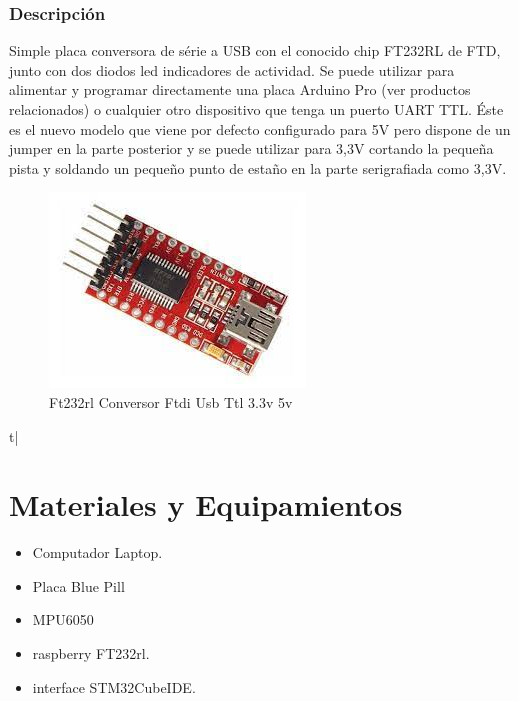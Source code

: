 \documentclass[12pt,oneside,spanish]{article}
\begin{document}
\subsubsection{Descripción}
Simple placa conversora de série a USB con el conocido chip FT232RL de FTD, junto con dos diodos led indicadores de actividad. Se puede utilizar para alimentar y programar directamente una placa Arduino Pro (ver productos relacionados) o cualquier otro dispositivo que tenga un puerto UART TTL. Éste es el nuevo modelo que viene por defecto configurado para 5V pero dispone de un jumper en la parte posterior y se puede utilizar para 3,3V cortando la pequeña pista y soldando un pequeño punto de estaño en la parte serigrafiada como 3,3V.
\begin{figure}[H]
    \centering
    \includegraphics{STM32CubeIDE/ras.jpg}
    \caption{Ft232rl Conversor Ftdi Usb Ttl 3.3v 5v}
    \label{fig:my_label}
\end{figure}
t|\section{Materiales y Equipamientos}
\begin{itemize}
    \item Computador Laptop.
    \item Placa Blue Pill
    \item MPU6050
    \item raspberry FT232rl.
    \item interface STM32CubeIDE.
\end{itemize}
\end{document}
